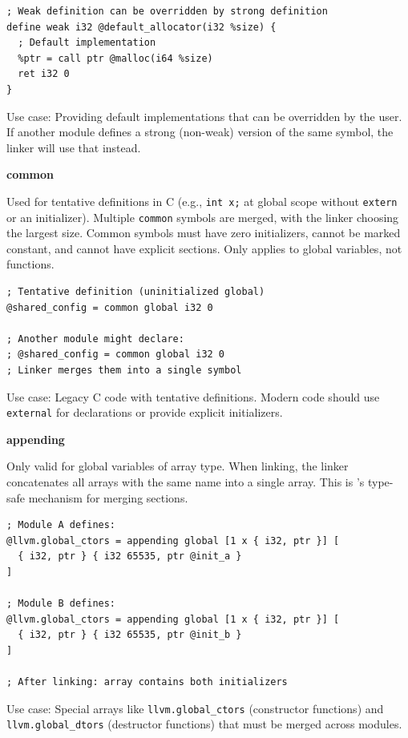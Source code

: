 \begin{lstlisting}[style=ir]
; Weak definition can be overridden by strong definition
define weak i32 @default_allocator(i32 %size) {
  ; Default implementation
  %ptr = call ptr @malloc(i64 %size)
  ret i32 0
}
\end{lstlisting}

Use case: Providing default implementations that can be overridden by the user. If another module defines a strong (non-weak) version of the same symbol, the linker will use that instead.

\textbf{common}

Used for tentative definitions in C (e.g., \texttt{int x;} at global scope without \texttt{extern} or an initializer).
Multiple \texttt{common} symbols are merged, with the linker choosing the largest size.
Common symbols must have zero initializers, cannot be marked constant, and cannot have explicit sections.
Only applies to global variables, not functions.

\begin{lstlisting}[style=ir]
; Tentative definition (uninitialized global)
@shared_config = common global i32 0

; Another module might declare:
; @shared_config = common global i32 0
; Linker merges them into a single symbol
\end{lstlisting}

Use case: Legacy C code with tentative definitions. Modern code should use \texttt{external} for declarations or provide explicit initializers.

\textbf{appending}

Only valid for global variables of array type. When linking, the linker concatenates all arrays with the same name into a single array. This is 's type-safe mechanism for merging sections.

\begin{lstlisting}[style=ir]
; Module A defines:
@llvm.global_ctors = appending global [1 x { i32, ptr }] [
  { i32, ptr } { i32 65535, ptr @init_a }
]

; Module B defines:
@llvm.global_ctors = appending global [1 x { i32, ptr }] [
  { i32, ptr } { i32 65535, ptr @init_b }
]

; After linking: array contains both initializers
\end{lstlisting}

Use case: Special  arrays like \texttt{llvm.global\_ctors} (constructor functions) and \texttt{llvm.global\_dtors} (destructor functions) that must be merged across modules.


